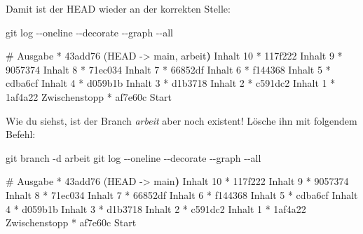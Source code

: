 \documentclass[
  ngerman,
  letterpaper,
  DIV=11]{scrreprt}
\newenvironment{Shaded}{\begin{snugshade}}{\end{snugshade}}
\newcommand{\AttributeTok}[1]{\textcolor[rgb]{0.40,0.45,0.13}{#1}}
\newcommand{\CommentTok}[1]{\textcolor[rgb]{0.37,0.37,0.37}{#1}}
\newcommand{\ErrorTok}[1]{\textcolor[rgb]{0.68,0.00,0.00}{#1}}
\newcommand{\ExtensionTok}[1]{\textcolor[rgb]{0.00,0.23,0.31}{#1}}
\newcommand{\FunctionTok}[1]{\textcolor[rgb]{0.28,0.35,0.67}{#1}}
\newcommand{\KeywordTok}[1]{\textcolor[rgb]{0.00,0.23,0.31}{\textbf{#1}}}
\newcommand{\NormalTok}[1]{\textcolor[rgb]{0.00,0.23,0.31}{#1}}
\newcommand{\OperatorTok}[1]{\textcolor[rgb]{0.37,0.37,0.37}{#1}}
\begin{document}
Damit ist der HEAD wieder an der korrekten Stelle:

\begin{Shaded}
\begin{Highlighting}[]
\FunctionTok{git}\NormalTok{ log }\AttributeTok{{-}{-}oneline} \AttributeTok{{-}{-}decorate} \AttributeTok{{-}{-}graph} \AttributeTok{{-}{-}all}

\CommentTok{\# Ausgabe }
\ExtensionTok{*}\NormalTok{ 43add76 }\ErrorTok{(}\ExtensionTok{HEAD} \AttributeTok{{-}}\OperatorTok{\textgreater{}}\NormalTok{ main, arbeit}\KeywordTok{)} \ExtensionTok{Inhalt}\NormalTok{ 10}
\ExtensionTok{*}\NormalTok{ 117f222 Inhalt 9}
\ExtensionTok{*}\NormalTok{ 9057374 Inhalt 8}
\ExtensionTok{*}\NormalTok{ 71ec034 Inhalt 7}
\ExtensionTok{*}\NormalTok{ 66852df Inhalt 6}
\ExtensionTok{*}\NormalTok{ f144368 Inhalt 5}
\ExtensionTok{*}\NormalTok{ cdba6cf Inhalt 4}
\ExtensionTok{*}\NormalTok{ d059b1b Inhalt 3}
\ExtensionTok{*}\NormalTok{ d1b3718 Inhalt 2}
\ExtensionTok{*}\NormalTok{ c591dc2 Inhalt 1}
\ExtensionTok{*}\NormalTok{ 1af4a22 Zwischenstopp}
\ExtensionTok{*}\NormalTok{ af7e60c Start}
\end{Highlighting}
\end{Shaded}

Wie du siehst, ist der Branch \emph{arbeit} aber noch existent! Lösche
ihn mit folgendem Befehl:

\begin{Shaded}
\begin{Highlighting}[]
\FunctionTok{git}\NormalTok{ branch }\AttributeTok{{-}d}\NormalTok{ arbeit }
\FunctionTok{git}\NormalTok{ log }\AttributeTok{{-}{-}oneline} \AttributeTok{{-}{-}decorate} \AttributeTok{{-}{-}graph} \AttributeTok{{-}{-}all}

\CommentTok{\# Ausgabe}
\ExtensionTok{*}\NormalTok{ 43add76 }\ErrorTok{(}\ExtensionTok{HEAD} \AttributeTok{{-}}\OperatorTok{\textgreater{}}\NormalTok{ main}\KeywordTok{)} \ExtensionTok{Inhalt}\NormalTok{ 10}
\ExtensionTok{*}\NormalTok{ 117f222 Inhalt 9}
\ExtensionTok{*}\NormalTok{ 9057374 Inhalt 8}
\ExtensionTok{*}\NormalTok{ 71ec034 Inhalt 7}
\ExtensionTok{*}\NormalTok{ 66852df Inhalt 6}
\ExtensionTok{*}\NormalTok{ f144368 Inhalt 5}
\ExtensionTok{*}\NormalTok{ cdba6cf Inhalt 4}
\ExtensionTok{*}\NormalTok{ d059b1b Inhalt 3}
\ExtensionTok{*}\NormalTok{ d1b3718 Inhalt 2}
\ExtensionTok{*}\NormalTok{ c591dc2 Inhalt 1}
\ExtensionTok{*}\NormalTok{ 1af4a22 Zwischenstopp}
\ExtensionTok{*}\NormalTok{ af7e60c Start}
\end{Highlighting}
\end{Shaded}
\end{document}
